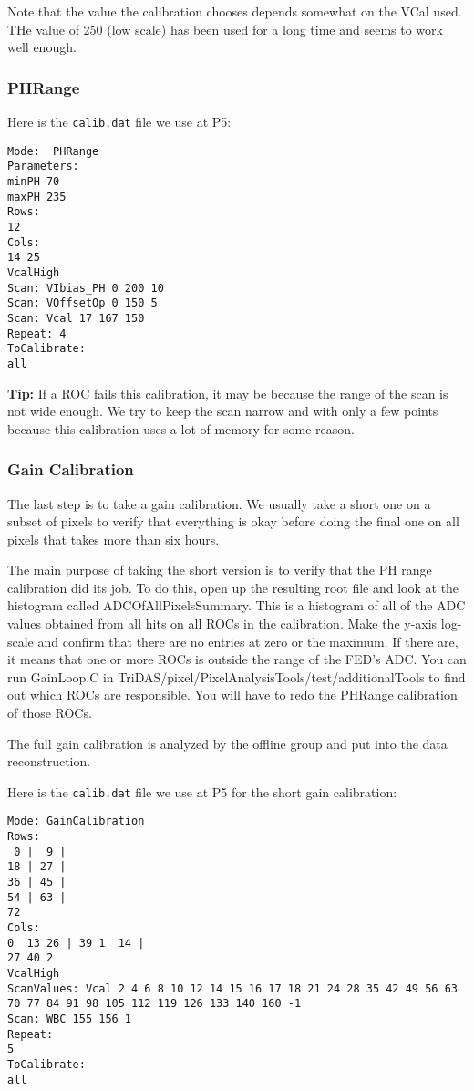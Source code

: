 Note that the value the calibration chooses depends somewhat on the VCal used.  THe value of 250 (low scale) has been used for a long time
and seems to work well enough.

\subsubsection{PHRange}

Here is the \verb|calib.dat| file we use at P5:
\begin{verbatim}
Mode:  PHRange
Parameters:
minPH 70
maxPH 235
Rows:
12
Cols:
14 25
VcalHigh
Scan: VIbias_PH 0 200 10
Scan: VOffsetOp 0 150 5
Scan: Vcal 17 167 150
Repeat: 4
ToCalibrate:
all
\end{verbatim}

{\bf Tip:} If a ROC fails this calibration, it may be because the range of the scan is not wide enough. 
 We try to keep the scan narrow and with only a few points because this calibration uses a lot of memory for some reason.


\subsubsection{Gain Calibration}

The last step is to take a gain calibration.  We usually take a short one on a subset of pixels to verify
that everything is okay before doing the final one on all pixels that takes more than six hours.

The main purpose of taking the short version is to verify that the PH range calibration did its job.
To do this, open up the resulting root file and look at the histogram called ADCOfAllPixelsSummary.  
This is a histogram
of all of the ADC values obtained from all hits on all ROCs in the calibration.  Make the y-axis
log-scale and confirm that there are no entries at zero or the maximum.  If there are, it means that
one or more ROCs is outside the range of the FED's ADC. You can run GainLoop.C in 
TriDAS/pixel/PixelAnalysisTools/test/additionalTools
to find out which ROCs are responsible.  You will have to redo the PHRange calibration of those ROCs.

The full gain calibration is analyzed by the offline group and put into the data reconstruction.


Here is the \verb|calib.dat| file we use at P5 for the short gain calibration:
\begin{verbatim}
Mode: GainCalibration
Rows:
 0 |  9 |
18 | 27 |
36 | 45 |
54 | 63 |
72
Cols:
0  13 26 | 39 1  14 |
27 40 2
VcalHigh
ScanValues: Vcal 2 4 6 8 10 12 14 15 16 17 18 21 24 28 35 42 49 56 63 70 77 84 91 98 105 112 119 126 133 140 160 -1
Scan: WBC 155 156 1
Repeat:
5
ToCalibrate:
all
\end{verbatim}

